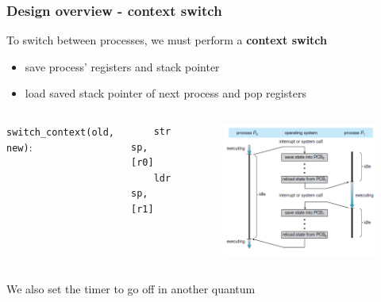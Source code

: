 \documentclass[10pt]{beamer}
\newcommand{\code}[1]{\texttt{#1}}
\begin{document}
\begin{frame}[fragile]
    \frametitle{Design overview - context switch}
    To switch between processes, we must perform a \textbf{context switch}
    \begin{itemize}
        \item save process' registers and stack pointer
        \item load saved stack pointer of next process and pop registers
    \end{itemize}

    \begin{columns}
        \code{switch\_context(old, new)}:
        \lstset{language=C,basicstyle=\ttfamily}
        \begin{lstlisting}
    str sp, [r0]
    ldr sp, [r1]
        \end{lstlisting}

        \begin{figure}
            \centering
            \includegraphics[width=\textwidth]{context_switch.png}
        \end{figure}
    \end{columns}

    We also set the timer to go off in another quantum
\end{frame}
\end{document}
